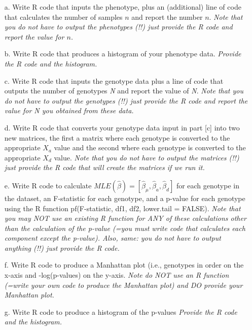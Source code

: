 \documentclass[letterpaper, 11pt]{article}
\begin{document}
\begin{itemize}

\item[a.]  Write R code that inputs the phenotype, plus an (additional) line of code that calculates the number of samples $n$ and report the number $n$.  \textit{Note that you do not have to output the phenotypes (!!) just provide the R code and report the value for $n$.}

\item[b.]  Write R code that produces a histogram of your phenotype data.  \textit{Provide the R code and the histogram.}

\item[c.] Write R code that inputs the genotype data plus a line of code that outputs the number of genotypes \textit{N} and report the value of \textit{N}.  \textit{Note that you do not have to output the genotypes (!!) just provide the R code and report the value for \textit{N} you obtained from these data.}

\item[d.] Write R code that converts your genotype data input in part [c] into two new matrices, the first a matrix where each genotype is converted to the appropriate $X_a$ value and the second where each genotype is converted to the appropriate $X_d$ value.  \textit{Note that you do not have to output the matrices (!!) just provide the R code that will create the matrices if we run it.}

\item[e.] Write R code to calculate $MLE(\hat{\beta}) = [\hat{\beta}_\mu, \hat{\beta}_a, \hat{\beta}_d]$ for each genotype in the dataset, an F-statistic for each genotype, and a p-value for each genotype using the R function pf(F-statistic, df1, df2, lower.tail = FALSE).  \textit{Note that you may NOT use an existing R function for ANY of these calculations other than the calculation of the p-value (=you must write code that calculates each component except the p-value).  Also, same: you do not have to output anything (!!) just provide the R code.}

\item[f.] Write R code to produce a Manhattan plot (i.e., genotypes in order on the x-axis and -log(p-values) on the y-axis.  \textit{Note do NOT use an R function (=write your own code to produce the Manhattan plot) and DO provide your Manhattan plot.}

\item[g.] Write R code to produce a histogram of the p-values \textit{Provide the R code and the histogram.}


\end{itemize}
\end{document}
